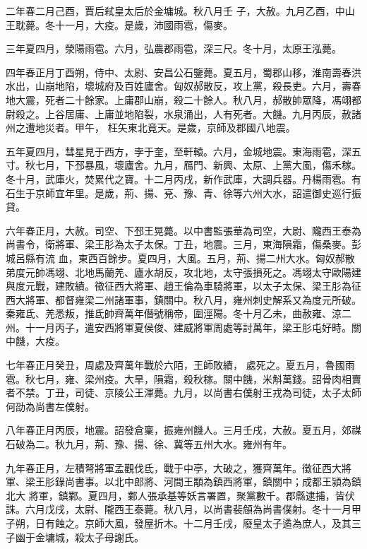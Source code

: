 \begin{pinyinscope}
 二年春二月己酉，賈后弒皇太后於金墉城。秋八月壬
 子，大赦。九月乙酉，中山王耽薨。冬十一月，大疫。是歲，沛國雨雹，傷麥。



 三年夏四月，滎陽雨雹。六月，弘農郡雨雹，深三尺。冬十月，太原王泓薨。



 四年春正月丁酉朔，侍中、太尉、安昌公石鑒薨。夏五月，蜀郡山移，淮南壽春洪水出，山崩地陷，壞城府及百姓廬舍。匈奴郝散反，攻上黨，殺長吏。六月，壽春地大震，死者二十餘家。上庸郡山崩，殺二十餘人。秋八月，郝散帥眾降，馮翊都尉殺之。上谷居庸、上庸並地陷裂，水泉涌出，人有死者。大饑。九月丙辰，赦諸州之遭地災者。甲午，
 枉矢東北竟天。是歲，京師及郡國八地震。



 五年夏四月，彗星見于西方，孛于奎，至軒轅。六月，金城地震。東海雨雹，深五寸。秋七月，下邳暴風，壞廬舍。九月，鴈門、新興、太原、上黨大風，傷禾稼。冬十月，武庫火，焚累代之寶。十二月丙戌，新作武庫，大調兵器。丹楊雨雹。有石生于京師宜年里。是歲，荊、揚、兗、豫、青、徐等六州大水，詔遣御史巡行振貸。



 六年春正月，大赦。司空、下邳王晃薨。以中書監張華為司空，大尉、隴西王泰為尚書令，衛將軍、梁王肜為太子太保。丁丑，地震。三月，東海隕霜，傷桑麥。彭城呂縣有流
 血，東西百餘步。夏四月，大風。五月，荊、揚二州大水。匈奴郝散弟度元帥馮翊、北地馬蘭羌、廬水胡反，攻北地，太守張損死之。馮翊太守歐陽建與度元戰，建敗績。徵征西大將軍、趙王倫為車騎將軍，以太子太保、梁王肜為征西大將軍、都督雍梁二州諸軍事，鎮關中。秋八月，雍州刺史解系又為度元所破。秦雍氐、羌悉叛，推氐帥齊萬年僭號稱帝，圍涇陽。冬十月乙未，曲赦雍、涼二州。十一月丙子，遣安西將軍夏侯俊、建威將軍周處等討萬年，梁王肜屯好畤。關中饑，大疫。



 七年春正月癸丑，周處及齊萬年戰於六陌，王師敗績，
 處死之。夏五月，魯國雨雹。秋七月，雍、梁州疫。大旱，隕霜，殺秋稼。關中饑，米斛萬錢。詔骨肉相賣者不禁。丁丑，司徒、京陵公王渾薨。九月，以尚書右僕射王戎為司徒，太子太師何劭為尚書左僕射。



 八年春正月丙辰，地震。詔發倉稟，振雍州饑人。三月壬戌，大赦。夏五月，郊禖石破為二。秋九月，荊、豫、揚、徐、冀等五州大水。雍州有年。



 九年春正月，左積弩將軍孟觀伐氐，戰于中亭，大破之，獲齊萬年。徵征西大將軍、梁王肜錄尚書事。以北中郎將、河間王顒為鎮西將軍，鎮關中；成都王潁為鎮北大
 將軍，鎮鄴。夏四月，鄴人張承基等妖言署置，聚黨數千。郡縣逮捕，皆伏誅。六月戊戌，太尉、隴西王泰薨。秋八月，以尚書裴頠為尚書僕射。冬十一月甲子朔，日有蝕之。京師大風，發屋折木。十二月壬戌，廢皇太子遹為庶人，及其三子幽于金墉城，殺太子母謝氏。




\end{pinyinscope}
